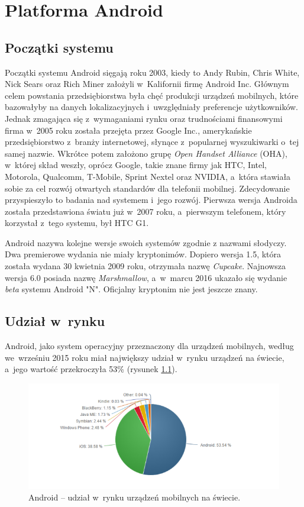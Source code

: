\chapter{Platforma Android}

\section{Początki systemu}
Początki systemu Android sięgają roku 2003, kiedy to Andy Rubin, Chris White, Nick Sears oraz Rich Miner założyli w~Kalifornii firmę Android Inc. Głównym celem powstania przedsiębiorstwa była chęć produkcji urządzeń mobilnych, które bazowałyby na danych lokalizacyjnych i~uwzględniały preferencje użytkowników. Jednak zmagająca się z~wymaganiami rynku oraz trudnościami finansowymi firma w~2005 roku została przejęta przez Google Inc., amerykańskie przedsiębiorstwo z~branży internetowej, słynące z~popularnej wyszukiwarki o~tej samej nazwie. Wkrótce potem założono grupę \textit{Open Handset Alliance} (OHA), w~której skład weszły, oprócz Google, takie znane firmy jak HTC, Intel, Motorola, Qualcomm, T-Mobile, Sprint Nextel oraz NVIDIA, a~która stawiała sobie za cel rozwój otwartych standardów dla telefonii mobilnej. Zdecydowanie przyspieszyło to badania nad systemem i~jego rozwój. Pierwsza wersja Androida została przedstawiona światu już w~2007 roku, a~pierwszym telefonem, który korzystał z~tego systemu, był HTC G1.

Android nazywa kolejne wersje swoich systemów zgodnie z nazwami słodyczy. Dwa premierowe wydania nie miały kryptonimów. Dopiero wersja 1.5, która została wydana 30 kwietnia 2009 roku, otrzymała nazwę \textit{Cupcake}. Najnowsza wersja 6.0 posiada nazwę \textit{Marshmallow}, a~w~marcu 2016 ukazało się wydanie \textit{beta} systemu Android "N". Oficjalny kryptonim nie jest jeszcze znany.

\section{Udział w~rynku}
Android, jako system operacyjny przeznaczony dla urządzeń mobilnych, według \cite{website:android:stat2} we~wrześniu 2015 roku miał największy udział w~rynku urządzeń na świecie, a~jego wartość przekroczyła 53\% (rysunek \ref{fig:android_udzial_zagranica}).

\newpage
\begin{figure}[!htb]
    \centering
    \includegraphics[width=17cm]{imgs/ch2_android_udzial_2.png}
    \caption
{Android – udział w~rynku urządzeń mobilnych na świecie\cite{website:android:stat2}.}
    \label{fig:android_udzial_zagranica}
\end{figure} 

